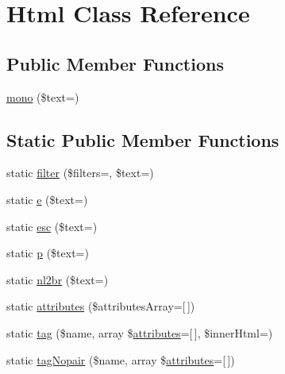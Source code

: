\hypertarget{class_pes_1_1_text_1_1_html}{}\section{Html Class Reference}
\label{class_pes_1_1_text_1_1_html}
\subsection*{Public Member Functions}
\begin{DoxyCompactItemize}
\item 
\mbox{\hyperlink{class_pes_1_1_text_1_1_html_ab811cc8c9ee6d5a10ad5cfa5073b0c58}{mono}} (\$text=\textquotesingle{}\textquotesingle{})
\end{DoxyCompactItemize}
\subsection*{Static Public Member Functions}
\begin{DoxyCompactItemize}
\item 
static \mbox{\hyperlink{class_pes_1_1_text_1_1_html_a6901ad57f053e0db94de132286ea8b29}{filter}} (\$filters=\textquotesingle{}\textquotesingle{}, \$text=\textquotesingle{}\textquotesingle{})
\item 
static \mbox{\hyperlink{class_pes_1_1_text_1_1_html_a66f9ba71608ca9d72eeb7a83f3653179}{e}} (\$text=\textquotesingle{}\textquotesingle{})
\item 
static \mbox{\hyperlink{class_pes_1_1_text_1_1_html_ac33811074e05e46a937899da7a858e70}{esc}} (\$text=\textquotesingle{}\textquotesingle{})
\item 
static \mbox{\hyperlink{class_pes_1_1_text_1_1_html_a78c9ebed5fc953d2eeb3801738777d54}{p}} (\$text=\textquotesingle{}\textquotesingle{})
\item 
static \mbox{\hyperlink{class_pes_1_1_text_1_1_html_a58fbeeef482da397c3066e42cfb421f8}{nl2br}} (\$text=\textquotesingle{}\textquotesingle{})
\item 
static \mbox{\hyperlink{class_pes_1_1_text_1_1_html_a52cc586be5c6248939b081a8fd7f187d}{attributes}} (\$attributes\+Array=\mbox{[}$\,$\mbox{]})
\item 
static \mbox{\hyperlink{class_pes_1_1_text_1_1_html_afff073be7d252662c101c78d011f33c1}{tag}} (\$name, array \$\mbox{\hyperlink{class_pes_1_1_text_1_1_html_a52cc586be5c6248939b081a8fd7f187d}{attributes}}=\mbox{[}$\,$\mbox{]}, \$inner\+Html=\textquotesingle{}\textquotesingle{})
\item 
static \mbox{\hyperlink{class_pes_1_1_text_1_1_html_a211f58d5a8928e1d23858cd9c8d8e022}{tag\+Nopair}} (\$name, array \$\mbox{\hyperlink{class_pes_1_1_text_1_1_html_a52cc586be5c6248939b081a8fd7f187d}{attributes}}=\mbox{[}$\,$\mbox{]})
\end{DoxyCompactItemize}


